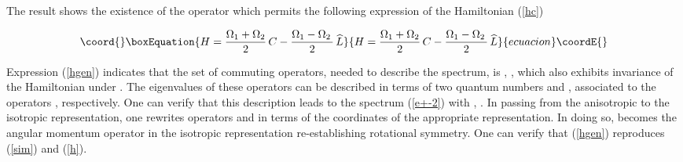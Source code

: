 \documentclass[a4paper,aps,prd,preprint]{revtex4}
\begin{document}
    The result shows the existence of the operator \coordHE{} which permits
    the following expression of the Hamiltonian (\ref{hc}) 
     
     \begin{equation}\coord{}\boxEquation{
    H={ \Omega_1 + \Omega_2\over 2}\, C -  {\Omega_1 -\Omega_2\,\over 2}\, 
    \widehat L
    \label{hgen}
    }{
    H={ \Omega_1 + \Omega_2\over 2}\, C -  {\Omega_1 -\Omega_2\,\over 2}\, 
    \widehat L
    }{ecuacion}\coordE{}\end{equation}
    
    Expression (\ref{hgen}) indicates that the  set of commuting  
    operators, needed to describe the spectrum, is \coordHE{}, \coordHE{}, \coordHE{} which
    also exhibits invariance of the Hamiltonian under \coordHE{}.
   The eigenvalues of these operators can be described in terms of two quantum 
   numbers  \coordHE{} and \coordHE{}, associated to the operators  \coordHE{},
   \coordHE{} respectively. One can verify that this description leads to
   the spectrum (\ref{e+-2}) with \coordHE{},  \coordHE{}. In passing from the 
   anisotropic to the isotropic  representation, one rewrites
   operators \coordHE{} and \coordHE{} in terms of the  coordinates of the 
   appropriate representation. In doing so, \coordHE{} becomes the angular
    momentum operator in the isotropic representation re-establishing 
    rotational symmetry. One can verify that (\ref{hgen}) reproduces (\ref{sim})
    and (\ref{h}).\\
    
\end{document}
